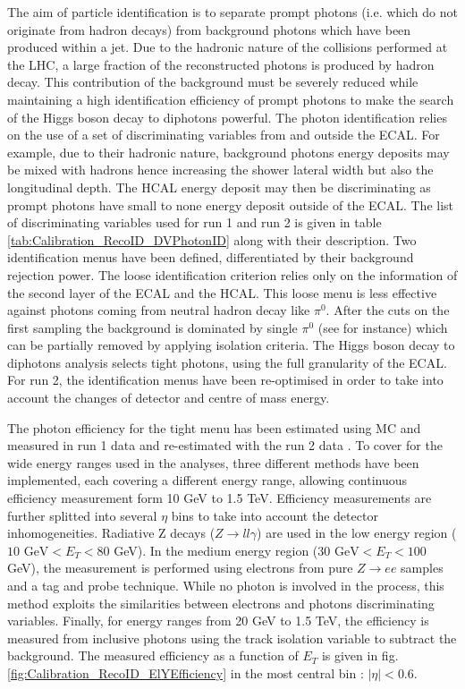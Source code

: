 The aim of particle identification is to separate prompt photons (i.e. which do not originate from hadron decays) from background photons which have been produced within a jet.
Due to the hadronic nature of the collisions performed at the LHC, a large fraction of the reconstructed photons is produced by hadron decay.
This contribution of the background must be severely reduced while maintaining a high identification efficiency of prompt photons to make the search of the Higgs boson decay to diphotons powerful.
The photon identification relies on the use of a set of discriminating variables from and outside the ECAL.
For example, due to their hadronic nature, background photons energy deposits may be mixed with hadrons hence increasing the shower lateral width but also the longitudinal depth.
The HCAL energy deposit may then be discriminating as prompt photons have small to none energy deposit outside of the ECAL.
The list of discriminating variables used for run 1 and run 2 is given in table \ref{tab:Calibration_RecoID_DVPhotonID} along with their description.
Two identification menus have been defined, differentiated by their background rejection power.
The loose identification criterion relies only on the information of the second layer of the ECAL and the HCAL.
This loose menu is less effective against photons coming from neutral hadron decay like $\pi^0$.
After the cuts on the first sampling the background is dominated by single $\pi^0$ (see \cite{CERN-THESIS-2011-157} for instance) which can be partially removed by applying isolation criteria.
The Higgs boson decay to diphotons analysis selects tight photons, using the full granularity of the ECAL.
For run 2, the identification menus have been re-optimised in order to take into account the changes of detector and centre of mass energy.

The photon efficiency for the tight menu has been estimated \cite{CERN-EP-2016-110,EGAM-2017-003} using MC and measured in run 1 data and re-estimated with the run 2 data \cite{ElectronEfficiencyRun2}.
To cover for the wide energy ranges used in the analyses, three different methods have been implemented, each covering a different energy range, allowing continuous efficiency measurement form 10 GeV to 1.5 TeV.
Efficiency measurements are further splitted into several $\eta$ bins to take into account the detector inhomogeneities.
Radiative Z decays (\(Z\rightarrow ll\gamma\)) are used in the low energy region ($10 \text{ GeV} <E_T<80$ GeV).
In the medium energy region ($30 \text{ GeV} <E_T<100$ GeV), the measurement is performed using electrons from pure $Z\rightarrow ee$ samples and a tag and probe technique.
While no photon is involved in the process, this method exploits the similarities between electrons and photons discriminating variables.
Finally, for energy ranges from 20 GeV to 1.5 TeV, the efficiency is measured from inclusive photons using the track isolation variable to subtract the background.
The measured efficiency as a function of \(E_T\) is given in fig. \ref{fig:Calibration_RecoID_ElYEfficiency} in the most central bin : $|\eta|<0.6$.


